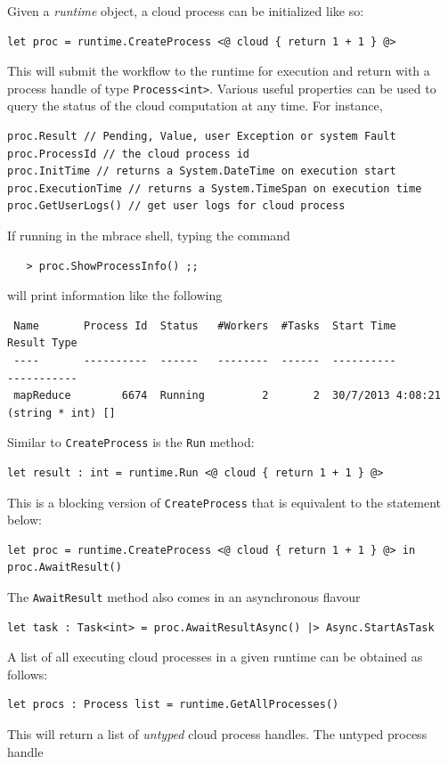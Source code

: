 \documentclass[9pt,a4paper]{article}
\newcommand{\mbrace}{mbrace}
\begin{document}
Given a \emph{runtime} object, a cloud process can be initialized like so:
\begin{lstlisting}
let proc = runtime.CreateProcess <@ cloud { return 1 + 1 } @>
\end{lstlisting}
This will submit the workflow to the runtime for execution and return with a process handle of
type \texttt{Process<int>}. Various useful properties can be used to query the status of the
cloud computation at any time. For instance,
\begin{lstlisting}
proc.Result // Pending, Value, user Exception or system Fault
proc.ProcessId // the cloud process id
proc.InitTime // returns a System.DateTime on execution start
proc.ExecutionTime // returns a System.TimeSpan on execution time
proc.GetUserLogs() // get user logs for cloud process
\end{lstlisting}
If running in the \mbrace{} shell, typing the command
\begin{verbatim}
   > proc.ShowProcessInfo() ;;
\end{verbatim}
will print information like the following
\begin{verbatim}
 Name       Process Id  Status   #Workers  #Tasks  Start Time         Result Type       
 ----       ----------  ------   --------  ------  ----------         -----------       
 mapReduce        6674  Running         2       2  30/7/2013 4:08:21  (string * int) [] 
\end{verbatim}
Similar to \texttt{CreateProcess} is the \texttt{Run} method:
\begin{lstlisting}
let result : int = runtime.Run <@ cloud { return 1 + 1 } @>
\end{lstlisting}
This is a blocking version of \texttt{CreateProcess} that is equivalent to the statement below:
\begin{lstlisting}
let proc = runtime.CreateProcess <@ cloud { return 1 + 1 } @> in
proc.AwaitResult()
\end{lstlisting}
%
The \texttt{AwaitResult} method also comes in an asynchronous flavour
\begin{lstlisting}
let task : Task<int> = proc.AwaitResultAsync() |> Async.StartAsTask
\end{lstlisting}
%
A list of all executing cloud processes in a given runtime can be obtained as follows:
\begin{lstlisting}
let procs : Process list = runtime.GetAllProcesses()
\end{lstlisting}
This will return a list of \emph{untyped} cloud process handles. The untyped process handle
\end{document}
